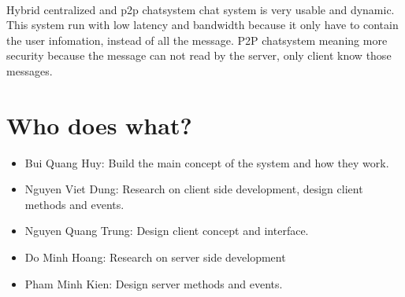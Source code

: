 \documentclass{article}
\begin{document}
    \paragraph{}
    Hybrid centralized and p2p chatsystem chat system is very usable and dynamic. This system run with low latency and bandwidth because it only have to contain the user infomation, instead of all the message. P2P chatsystem meaning more security because the message can not read by the server, only client know those messages.
\section{Who does what?}

\begin{itemize}
	\item Bui Quang Huy: Build the main concept of the system and how they work.
	\item Nguyen Viet Dung: Research on client side development, design client methods and events.
	\item Nguyen Quang Trung: Design client concept and interface.
	\item Do Minh Hoang: Research on server side development
	\item Pham Minh Kien: Design server methods and events.
\end{itemize}
\end{document}
